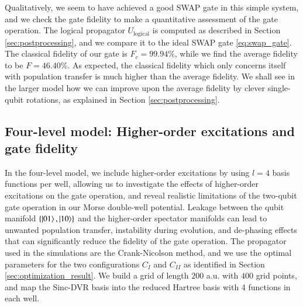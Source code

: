 \documentclass{subfiles}
\begin{document}
Qualitatively, we seem to have achieved a good SWAP gate in this simple system, and we check the gate fidelity to make a quantitative assessment of the gate operation. The logical propagator $U_{\text{logical}}$ is computed as described in Section \ref{sec:postprocessing}, and we compare it to the ideal SWAP gate \eqref{eq:swap_gate}. The classical fidelity of our gate is $F_c = 99.94\%$, while we find the average fidelity to be $F = 46.40\%$. As expected, the classical fidelity which only concerns itself with population transfer is much higher than the average fidelity. We shall see in the larger model how we can improve upon the average fidelity by clever single-qubit rotations, as explained in Section \ref{sec:postprocessing}.

\subsection{Four-level model: Higher-order excitations and gate fidelity}
In the four-level model, we include higher-order excitations by using $l=4$ basis functions per well, allowing us to investigate the effects of higher-order excitations on the gate operation, and reveal realistic limitations of the two-qubit gate operation in our Morse double-well potential. Leakage between the qubit manifold $\{\ket{01}, \ket{10}\}$ and the higher-order spectator manifolds can lead to unwanted population transfer, instability during evolution, and de-phasing effects that can significantly reduce the fidelity of the gate operation. The propagator used in the simulations are the Crank-Nicolson method, and we use the optimal parameters for the two configurations $C_I$ and $C_{II}$ as identified in Section \ref{sec:optimization_result}. We build a grid of length $200$ a.u. with $400$ grid points, and map the Sinc-DVR basis into the reduced Hartree basis with 4 functions in each well.
\end{document}
